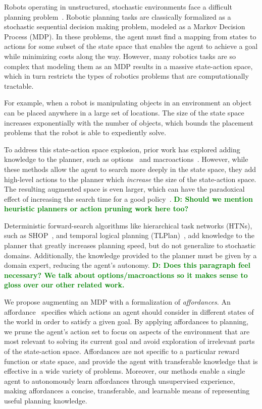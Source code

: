 \documentclass[conference]{IEEEtran}
\newcommand{\dnote}[1]{\textcolor{Green}{\textbf{D: #1}}}
\begin{document}
Robots operating in unstructured, stochastic environments face
a difficult planning problem~\citep{bollini12,knepper13}.
Robotic planning tasks are classically formalized as a stochastic sequential
decision making problem, modeled as a Markov Decision Process (MDP). In these problems,
the agent must find a mapping from states to actions for some subset of the 
state space that enables the agent to achieve a goal while minimizing costs 
along the way. However, many robotics tasks are so complex that modeling
them as an MDP results in a massive state-action space, 
which in turn restricts the types of robotics problems that are computationally tractable.
 
For example, when a robot is manipulating objects in an environment
an object can be placed anywhere in a large set of locations. The size
of the state space increases exponentially with the number of objects,
which bounds the placement problems that the robot is able to expediently solve.

To address this state-action space explosion, prior work has explored adding knowledge to the planner,
such as options~\cite{sutton99} and macroactions~\cite{Botea:2005kx,Newton:2005vn}. 
However, while these methods allow the agent to search more deeply in the state
space, they add high-level actions to the planner which {\em increase} the size of the state-action space.
The resulting augmented space is even larger, which can have the paradoxical 
effect of increasing the search time for a good policy~\cite{Jong:2008zr}.
\dnote{Should we mention heuristic planners or action pruning work here too?}

Deterministic forward-search algorithms like hierarchical task networks (HTNs),
such as SHOP~\citep{Nau:1999:SSH:1624312.1624357}, and
temporal logical planning (TLPlan)~\citep{Bacchus95usingtemporal,Bacchus99usingtemporal}, 
add knowledge to the planner that greatly increases planning speed, but do not
generalize to stochastic domains. Additionally, the knowledge provided to the 
planner must be given by a domain expert, reducing the agent's autonomy.
\dnote{Does this paragraph feel necessary? We talk about options/macroactions so it makes sense
to gloss over our other related work.}

We propose augmenting an MDP with a formalization of {\em affordances}. An
affordance~\cite{gibson77} specifies which actions an agent should consider in
different states of the world in order to satisfy a given goal. By applying affordances 
to planning, we prune the agent's action set to focus on aspects of the environment
that are most relevant to solving its current goal and avoid exploration of irrelevant 
parts of the state-action space. Affordances are not specific to a particular reward
function or state space, and provide the agent with transferable knowledge that is 
effective in a wide variety of problems. Moreover, our methods enable a single agent 
to autonomously learn affordances through unsupervised experience, making affordances 
a concise, transferable, and learnable means of representing useful planning knowledge.
\end{document}
